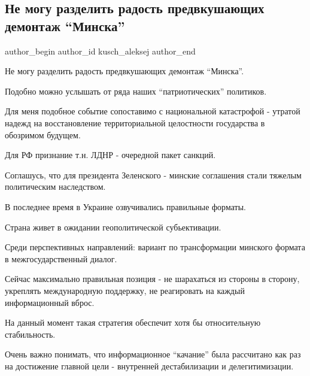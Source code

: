  
 
 
 
 
 
\subsection{Не могу разделить радость предвкушающих демонтаж \enquote{Минска}}
\label{sec:21_02_2022.fb.kusch_aleksej.1.minsk_demontazh_plan_kiev}
 
\ifcmt
 author_begin
   author_id kusch_aleksej
 author_end
\fi

Не могу разделить радость предвкушающих демонтаж \enquote{Минска}. 

Подобно можно услышать от ряда наших \enquote{патриотических} политиков.

Для меня подобное событие сопоставимо с национальной катастрофой - утратой
надежд на восстановление территориальной целостности государства в обозримом
будущем.

Для РФ признание т.н. ЛДНР - очередной пакет санкций. 

Соглашусь, что для президента Зеленского - минские соглашения стали тяжелым
политическим наследством.

В последнее время в Украине озвучивались правильные форматы.

Страна живет в ожидании геополитической субьективации.

Среди перспективных направлений: вариант по трансформации минского формата в
межгосударственный диалог.

Сейчас максимально правильная позиция - не шарахаться из стороны в сторону,
укреплять международную поддержку, не реагировать на каждый информационный
вброс.

На данный момент такая стратегия обеспечит хотя бы относительную стабильность.

Очень важно понимать, что информационное \enquote{качание} была рассчитано как
раз на достижение главной цели - внутренней дестабилизации и делегитимизации.


